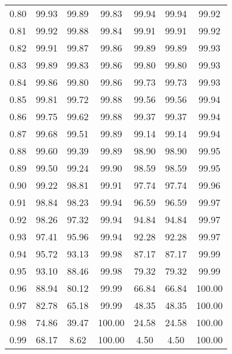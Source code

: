 \begin{tabular}{|c|c|c|c|c|c|c|}
      0.80 &     99.93 &     99.89 &      99.83 &   99.94 &      99.94 &         99.92 \\
      0.81 &     99.92 &     99.88 &      99.84 &   99.91 &      99.91 &         99.92 \\
      0.82 &     99.91 &     99.87 &      99.86 &   99.89 &      99.89 &         99.93 \\
      0.83 &     99.89 &     99.83 &      99.86 &   99.80 &      99.80 &         99.93 \\
      0.84 &     99.86 &     99.80 &      99.86 &   99.73 &      99.73 &         99.93 \\
      0.85 &     99.81 &     99.72 &      99.88 &   99.56 &      99.56 &         99.94 \\
      0.86 &     99.75 &     99.62 &      99.88 &   99.37 &      99.37 &         99.94 \\
      0.87 &     99.68 &     99.51 &      99.89 &   99.14 &      99.14 &         99.94 \\
      0.88 &     99.60 &     99.39 &      99.89 &   98.90 &      98.90 &         99.95 \\
      0.89 &     99.50 &     99.24 &      99.90 &   98.59 &      98.59 &         99.95 \\
      0.90 &     99.22 &     98.81 &      99.91 &   97.74 &      97.74 &         99.96 \\
      0.91 &     98.84 &     98.23 &      99.94 &   96.59 &      96.59 &         99.97 \\
      0.92 &     98.26 &     97.32 &      99.94 &   94.84 &      94.84 &         99.97 \\
      0.93 &     97.41 &     95.96 &      99.94 &   92.28 &      92.28 &         99.97 \\
      0.94 &     95.72 &     93.13 &      99.98 &   87.17 &      87.17 &         99.99 \\
      0.95 &     93.10 &     88.46 &      99.98 &   79.32 &      79.32 &         99.99 \\
      0.96 &     88.94 &     80.12 &      99.99 &   66.84 &      66.84 &        100.00 \\
      0.97 &     82.78 &     65.18 &      99.99 &   48.35 &      48.35 &        100.00 \\
      0.98 &     74.86 &     39.47 &     100.00 &   24.58 &      24.58 &        100.00 \\
      0.99 &     68.17 &      8.62 &     100.00 &    4.50 &       4.50 &        100.00 \\
\bottomrule
\end{tabular}
